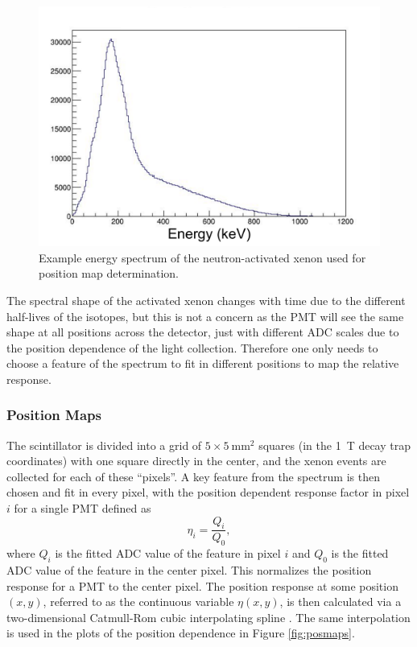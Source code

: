 \begin{figure}[h] 
\centering
\includegraphics[scale=.5]{4-UCNACalibrations/xenonSpectrum.pdf}
\caption{Example energy spectrum of the neutron-activated xenon used for position map determination. }
\label{fig:xenonSpectrum}
\end{figure}

The spectral shape of the activated xenon changes with time due to the different half-lives
of the isotopes, but this is not a concern as the PMT will see the same shape at all positions
across the detector, just with different ADC scales due to the position dependence of the light
collection. Therefore one only needs to choose a feature of the spectrum to fit in different
positions to map the relative response.

\subsubsection{Position Maps} \label{sssec:posmaps}

The scintillator is divided into a grid of $5\times5\mathrm{~mm}^2$ squares (in the 1~T
decay trap coordinates) with one square directly in the center,
and the xenon events are collected for each of these ``pixels''. A key feature
from the spectrum is then chosen and fit in every pixel, with the position dependent response
factor in pixel $i$ for a single PMT defined as
%
\begin{equation}
  \eta_i = \frac{Q_i}{Q_0},
\end{equation}
%
where $Q_i$ is the fitted ADC value of the feature in pixel $i$ and $Q_0$ is the fitted ADC value of the
feature in the center pixel. This normalizes the position response for a PMT to the center pixel. The
position response at some position $(x,y)$, referred to as the continuous variable $\eta(x,y)$,
is then calculated via a two-dimensional Catmull-Rom
cubic interpolating spline \cite{catmull1974}. The same interpolation is used in the plots of the
position dependence in Figure \ref{fig:posmaps}.


